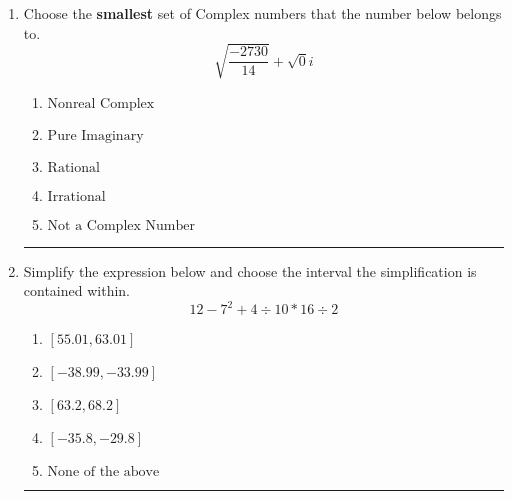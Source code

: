\documentclass[14pt]{extbook}
\newcommand{\litem}[1]{\item#1\hspace*{-1cm}\rule{\textwidth}{0.4pt}}
\begin{document}
\begin{enumerate}
{\begin{enumerate}[label=\Alph*.]
\end{enumerate} }
\litem{
Choose the \textbf{smallest} set of Complex numbers that the number below belongs to.\[ \sqrt{\frac{-2730}{14}}+\sqrt{0}i \]\begin{enumerate}[label=\Alph*.]
\item \( \text{Nonreal Complex} \)
\item \( \text{Pure Imaginary} \)
\item \( \text{Rational} \)
\item \( \text{Irrational} \)
\item \( \text{Not a Complex Number} \)

\end{enumerate} }
\litem{
Simplify the expression below and choose the interval the simplification is contained within.\[ 12 - 7^2 + 4 \div 10 * 16 \div 2 \]\begin{enumerate}[label=\Alph*.]
\item \( [55.01, 63.01] \)
\item \( [-38.99, -33.99] \)
\item \( [63.2, 68.2] \)
\item \( [-35.8, -29.8] \)
\item \( \text{None of the above} \)

\end{enumerate} }
\end{enumerate}
\end{document}
